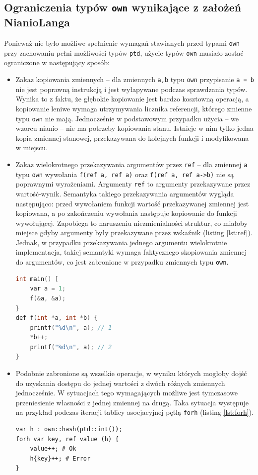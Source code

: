 \documentclass[licencjacka]{pracamgr}
\begin{document}
\subsection{Ograniczenia typów \texttt{own} wynikające z założeń NianioLanga}
Ponieważ nie było możliwe spełnienie wymagań stawianych przed typami \texttt{own} przy zachowaniu pełni
możliwości typów \texttt{ptd}, użycie typów \texttt{own} musiało zostać ograniczone w następujący sposób:
\begin{itemize}
 \item Zakaz kopiowania zmiennych -- dla zmiennych \texttt{a,b} typu \texttt{own} przypisanie
 \texttt{a = b} nie jest poprawną instrukcją i jest wyłapywane podczas sprawdzania typów.
 Wynika to z faktu, że głębokie kopiowanie jest bardzo kosztowną operacją, a kopiowanie leniwe wymaga
 utrzymywania licznika referencji, którego zmienne typu \texttt{own} nie mają.
 Jednocześnie w podstawowym przypadku użycia -- we wzorcu nianio -- nie ma potrzeby kopiowania stanu.
 Istnieje w nim tylko jedna kopia zmiennej stanowej, przekazywana do kolejnych funkcji i modyfikowana w miejscu.
 \item Zakaz wielokrotnego przekazywania argumentów przez \texttt{ref} -- dla zmiennej \texttt{a} typu
 \texttt{own} wywołania \texttt{f(ref a, ref a)} oraz \texttt{f(ref a, ref a->b)} nie są poprawnymi wyrażeniami.
 Argumenty \texttt{ref} to argumenty przekazywane przez wartość-wynik.
 Semantyka takiego przekazywania argumentów wygląda następująco: przed wywołaniem funkcji wartość przekazywanej
 zmiennej jest kopiowana, a po zakończeniu wywołania następuje kopiowanie do funkcji wywołującej.
 Zapobiega to naruszeniu niezmienialności struktur,
 co miałoby miejsce gdyby argumenty były przekazywane przez wskaźnik (listing \ref{lst:ref}).
 Jednak, w przypadku przekazywania jednego argumentu wielokrotnie implementacja, takiej semantyki wymaga
 faktycznego skopiowania zmiennej do argumentów, co jest zabronione w przypadku zmiennych typu \texttt{own}.
\begin{lstlisting}[caption={Naruszenie niezmienialności wartości w C},label={lst:ref},language=C]
int main() [
	var a = 1;
	f(&a, &a);
}
def f(int *a, int *b) {
	printf("%d\n", a); // 1
	*b++;
	printf("%d\n", a); // 2
}
\end{lstlisting}
 \item Podobnie zabronione są wszelkie operacje, w wyniku których mogłoby dojść do uzyskania dostępu
 do jednej wartości z dwóch różnych zmiennych jednocześnie. W sytuacjach tego wymagających możliwe jest tymczasowe
 przeniesienie własności z jednej zmiennej na drugą. Taka sytuacja występuje na przykład podczas iteracji
 tablicy asocjacyjnej pętlą \texttt{forh} (listing \ref{lst:forh}).
\begin{lstlisting}[caption={Odwołanie do zmiennej, która utraciła własność},label={lst:forh},language=nl]
var h : own::hash(ptd::int());
forh var key, ref value (h) {
	value++; # Ok
	h{key}++; # Error
}
\end{lstlisting}
\end{itemize}
\end{document}
